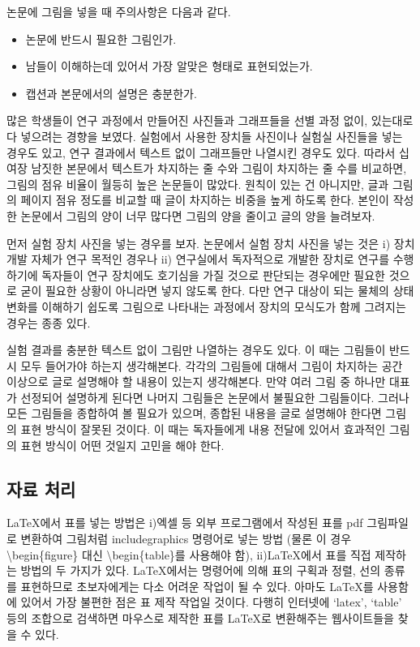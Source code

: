 \documentclass{gshs-report-v1.2}
\begin{document}
논문에 그림을 넣을 때 주의사항은 다음과 같다.
\begin{itemize}
	\item{논문에 반드시 필요한 그림인가.}
	\item{남들이 이해하는데 있어서 가장 알맞은 형태로 표현되었는가.}
	\item{캡션과 본문에서의 설명은 충분한가.}
\end{itemize}
많은 학생들이 연구 과정에서 만들어진 사진들과 그래프들을 선별 과정 없이, 있는대로 다 넣으려는 경향을 보였다. 실험에서 사용한 장치들 사진이나 실험실 사진들을 넣는 경우도 있고, 연구 결과에서 텍스트 없이 그래프들만 나열시킨 경우도 있다. 따라서 십여장 남짓한 본문에서 텍스트가 차지하는 줄 수와 그림이 차지하는 줄 수를 비교하면, 그림의 점유 비율이 월등히 높은 논문들이 많았다. 원칙이 있는 건 아니지만, 글과 그림의 페이지 점유 정도를 비교할 때 글이 차지하는 비중을 높게 하도록 한다. 본인이 작성한 논문에서 그림의 양이 너무 많다면 그림의 양을 줄이고 글의 양을 늘려보자.

먼저 실험 장치 사진을 넣는 경우를 보자. 논문에서 실험 장치 사진을 넣는 것은 i) 장치 개발 자체가 연구 목적인 경우나 ii) 연구실에서 독자적으로 개발한 장치로 연구를 수행하기에 독자들이 연구 장치에도 호기심을 가질 것으로 판단되는 경우에만 필요한 것으로 굳이 필요한 상황이 아니라면 넣지 않도록 한다. 다만 연구 대상이 되는 물체의 상태 변화를 이해하기 쉽도록 그림으로 나타내는 과정에서 장치의 모식도가 함께 그려지는 경우는 종종 있다.

실험 결과를 충분한 텍스트 없이 그림만 나열하는 경우도 있다. 이 때는 그림들이 반드시 모두 들어가야 하는지 생각해본다. 각각의 그림들에 대해서 그림이 차지하는 공간 이상으로 글로 설명해야 할 내용이 있는지 생각해본다. 만약 여러 그림 중 하나만 대표가 선정되어 설명하게 된다면 나머지 그림들은 논문에서 불필요한 그림들이다. 그러나 모든 그림들을 종합하여 볼 필요가 있으며, 종합된 내용을 글로 설명해야 한다면 그림의 표현 방식이 잘못된 것이다. 이 때는 독자들에게 내용 전달에 있어서 효과적인 그림의 표현 방식이 어떤 것일지 고민을 해야 한다.

\subsection{자료 처리}

\LaTeX 에서 표를 넣는 방법은 i)엑셀 등 외부 프로그램에서 작성된 표를 pdf 그림파일로 변환하여 그림처럼 includegraphics 명령어로 넣는 방법 (물론 이 경우 {\textbackslash}begin\{figure\} 대신 {\textbackslash}begin\{table\}를 사용해야 함), ii)\LaTeX 에서 표를 직접 제작하는 방법의 두 가지가 있다. \LaTeX 에서는 명령어에 의해 표의 구획과 정렬, 선의 종류를 표현하므로 초보자에게는 다소 어려운 작업이 될 수 있다. 아마도 \LaTeX 를 사용함에 있어서 가장 불편한 점은 표 제작 작업일 것이다. 다행히 인터넷에 `latex', `table' 등의 조합으로 검색하면 마우스로 제작한 표를 \LaTeX 로 변환해주는 웹사이트들을 찾을 수 있다.
\end{document}
